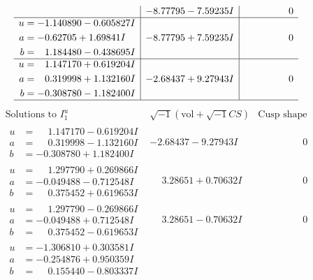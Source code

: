 \documentclass[1p]{elsarticle_modified}
\theoremstyle{definition}
\newcommand{\I}{\sqrt{-1}}
\begin{document}
$$\begin{array}{c|c|c}
 & -8.77795 - 7.59235 I & \phantom{-0.000000 } 0 \\ \hline\begin{aligned}
u &= -1.140890 - 0.605827 I \\
a &= -0.62705 + 1.69841 I \\
b &= \phantom{-}1.184480 - 0.438695 I\end{aligned}
 & -8.77795 + 7.59235 I & \phantom{-0.000000 } 0 \\ \hline\begin{aligned}
u &= \phantom{-}1.147170 + 0.619204 I \\
a &= \phantom{-}0.319998 + 1.132160 I \\
b &= -0.308780 - 1.182400 I\end{aligned}
 & -2.68437 + 9.27943 I & \phantom{-0.000000 } 0\\
 \hline 
 \end{array}$$\newpage$$\begin{array}{c|c|c}  
\text{Solutions to }I^u_{1}& \I (\text{vol} + \sqrt{-1}CS) & \text{Cusp shape}\\
 \hline 
\begin{aligned}
u &= \phantom{-}1.147170 - 0.619204 I \\
a &= \phantom{-}0.319998 - 1.132160 I \\
b &= -0.308780 + 1.182400 I\end{aligned}
 & -2.68437 - 9.27943 I & \phantom{-0.000000 } 0 \\ \hline\begin{aligned}
u &= \phantom{-}1.297790 + 0.269866 I \\
a &= -0.049488 - 0.712548 I \\
b &= \phantom{-}0.375452 + 0.619653 I\end{aligned}
 & \phantom{-}3.28651 + 0.70632 I & \phantom{-0.000000 } 0 \\ \hline\begin{aligned}
u &= \phantom{-}1.297790 - 0.269866 I \\
a &= -0.049488 + 0.712548 I \\
b &= \phantom{-}0.375452 - 0.619653 I\end{aligned}
 & \phantom{-}3.28651 - 0.70632 I & \phantom{-0.000000 } 0 \\ \hline\begin{aligned}
u &= -1.306810 + 0.303581 I \\
a &= -0.254876 + 0.950359 I \\
b &= \phantom{-}0.155440 - 0.803337 I\end{aligned}

\end{array}$$
\end{document}
